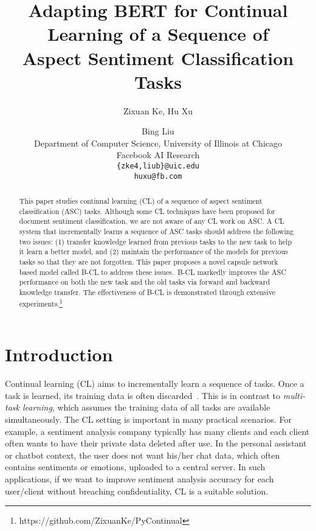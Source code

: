 \documentclass[11pt]{article}
\title{Adapting BERT for Continual Learning of a Sequence of \\ Aspect Sentiment Classification Tasks}
\author{
Zixuan Ke, Hu Xu \and Bing Liu \\ Department of Computer Science, University of Illinois at Chicago\\
Facebook AI Research\\
\texttt{\{zke4,liub\}@uic.edu}\\  \texttt{huxu@fb.com}}
\begin{document}
\maketitle
\begin{abstract}


This paper studies continual learning (CL) of a sequence of aspect sentiment classification (ASC) tasks. Although some CL techniques have been proposed for document sentiment classification, we are not aware of any CL work on ASC. A CL system that incrementally learns a sequence of ASC tasks should address the following two issues:  
(1) transfer knowledge learned from previous tasks to the new task to help it learn a better model, and (2) maintain the performance of the models for previous tasks so that they are not forgotten. This paper proposes a novel capsule network based model called B-CL to address these issues.~B-CL markedly improves the ASC performance on both the new task and the old tasks via forward and backward knowledge transfer. The effectiveness of B-CL is demonstrated through extensive experiments.\footnote{https://github.com/ZixuanKe/PyContinual}
\end{abstract}

\section{Introduction}
\label{sec.intro}


Continual learning (CL) aims to incrementally learn a sequence of tasks. Once a task is learned, its training data is often discarded~\cite{chen2018lifelong}. This is in contrast to \textit{multi-task learning}, which assumes the training data of all tasks are available simultaneously. The CL setting is important in many practical scenarios. For example, a sentiment analysis company typically has many clients and each client often wants to have their private data deleted after use. In the personal assistant or chatbot context, the user does not want his/her chat data, which often contains sentiments or emotions, uploaded to a central server. In such applications, if we want to improve sentiment analysis accuracy for each user/client without breaching confidentiality, CL is a suitable solution. 
\end{document}
